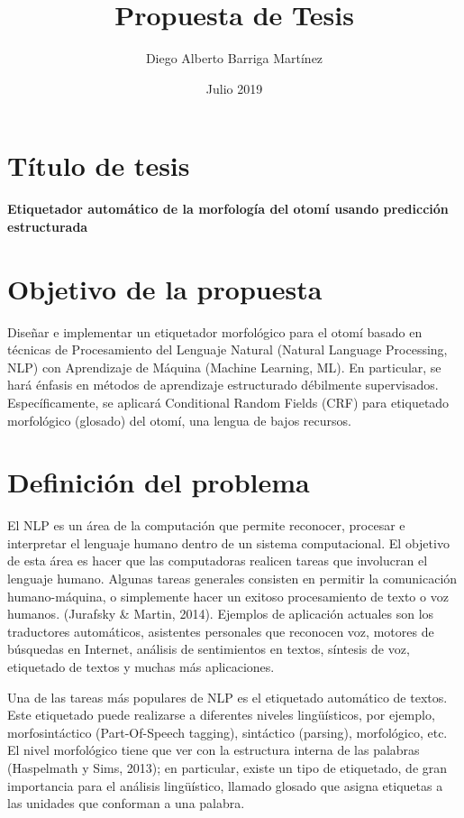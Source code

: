 \documentclass{article}
\title{Propuesta de Tesis}
\author{Diego Alberto Barriga Martínez}
\date{Julio 2019}
\begin{document}
\maketitle
\tableofcontents
\newpage
\section{Título de tesis}
\textbf{Etiquetador automático de la morfología del otomí usando predicción estructurada}

\section{Objetivo de la propuesta}
Diseñar e implementar un etiquetador morfológico para el otomí basado en
técnicas de Procesamiento del Lenguaje Natural (Natural Language Processing,
NLP) con Aprendizaje de Máquina (Machine Learning, ML). En particular, se hará
énfasis en métodos de aprendizaje estructurado débilmente supervisados.
Específicamente, se aplicará Conditional Random Fields (CRF) para etiquetado
morfológico (glosado) del otomí, una lengua de bajos recursos.

\section{Definición del problema}
El NLP es un área de la computación que permite reconocer, procesar e
interpretar el lenguaje humano dentro de un sistema computacional. El objetivo
de esta área es hacer que las computadoras realicen tareas que involucran el
lenguaje humano. Algunas tareas generales consisten en permitir la comunicación
humano-máquina, o simplemente hacer un exitoso procesamiento de texto o voz
humanos. (Jurafsky \& Martin, 2014). Ejemplos de aplicación actuales son los
traductores automáticos, asistentes personales que reconocen voz, motores de
búsquedas en Internet, análisis de sentimientos en textos,  síntesis de voz,
etiquetado de textos y muchas más aplicaciones.

Una de las tareas más populares de NLP es el etiquetado automático de textos.
Este etiquetado puede realizarse a diferentes niveles lingüísticos, por
ejemplo, morfosintáctico (Part-Of-Speech tagging), sintáctico (parsing),
morfológico, etc.  El nivel morfológico tiene que ver con la estructura interna
de las palabras (Haspelmath y Sims, 2013); en particular, existe un tipo de
etiquetado, de gran importancia para el análisis lingüístico, llamado glosado
que asigna etiquetas a las unidades que conforman a una palabra. 
\end{document}
